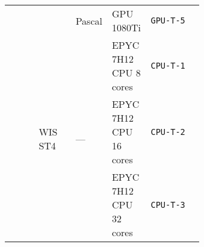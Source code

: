 \begin{tabular}{p{0.15\linewidth}p{0.19\linewidth}p{0.10\linewidth}p{0.20\linewidth}l}
                                                                    &                                                                 & Pascal                                                    & GPU 1080Ti             & \texttt{GPU-T-5} \\
    \cline{2-5}
                                                                    & \multirow[t]{3}{*}{\parbox{1\linewidth}{\vspace{2.3cm}WIS ST4}} & \multirow[t]{3}{*}{\parbox{1\linewidth}{\vspace{2.3cm}—}} & EPYC 7H12 CPU 8 cores  & \texttt{CPU-T-1} \\

                                                                    &                                                                 &                                                           & EPYC 7H12 CPU 16 cores & \texttt{CPU-T-2} \\

                                                                    &                                                                 &                                                           & EPYC 7H12 CPU 32 cores & \texttt{CPU-T-3} \\
    \cline{1-5}
    \bottomrule
\end{tabular}
